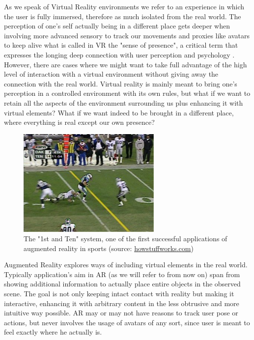 As we speak of Virtual Reality environments we refer to an experience in which the user is fully immersed, therefore as much isolated from the real world. The perception of one’s self actually being in a different place gets deeper when involving more advanced sensory to track our movements and proxies like avatars to keep alive what is called in VR the "sense of presence", a critical term that expresses the longing deep connection with user perception and psychology \cite{vr_presence}. However, there are cases where we might want to take full advantage of the high level of interaction with a virtual environment without giving away the connection with the real world. Virtual reality is mainly meant to bring one’s perception in a controlled environment with its own rules, but what if we want to retain all the aspects of the environment surrounding us plus enhancing it with virtual elements? What if we want indeed to be brought in a different place, where everything is real except our own presence?

\begin{figure}
\centering
\includegraphics[width=7cm]{pictures/1st_and_ten}
\caption{The "1st and Ten" system, one of the first successful applications of augmented reality in sports (source: \href{http://www.howstuffworks.com/first-down-line.htm}{howstuffworks.com})}
\label{fig:rugby_ar}
\end{figure}

Augmented Reality explores ways of including virtual elements in the real world. Typically application’s aim in AR (as we will refer to from now on) span from showing additional information to actually place entire objects in the observed scene. The goal is not only keeping intact contact with reality but making it interactive, enhancing it with arbitrary content in the less obtrusive and more intuitive way possible. AR may or may not have reasons to track user pose or actions, but never involves the usage of avatars of any sort, since user is meant to feel exactly where he actually is.

